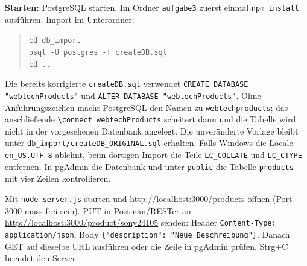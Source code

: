 \documentclass[11pt,a4paper]{article}
\begin{document}
\textbf{Starten:} PostgreSQL starten. Im Ordner \texttt{aufgabe3} zuerst einmal
\texttt{npm install} ausführen. Import im Unterordner:
\begin{quote}
\texttt{cd db\_import}\\
\texttt{psql -U postgres -f createDB.sql}\\
\texttt{cd ..}
\end{quote}
Die bereits korrigierte \texttt{createDB.sql} verwendet
\texttt{CREATE DATABASE "webtechProducts"} und
\texttt{ALTER DATABASE "webtechProducts"}. Ohne Anführungszeichen macht
PostgreSQL den Namen zu \texttt{webtechproducts}; das anschließende
\texttt{\textbackslash connect webtechProducts} scheitert dann und die
Tabelle wird nicht in der vorgesehenen Datenbank angelegt.
Die unveränderte Vorlage bleibt unter
\texttt{db\_import/createDB\_ORIGINAL.sql} erhalten.
Falls Windows die Locale \texttt{en\_US.UTF-8} ablehnt, beim dortigen
Import die Teile \texttt{LC\_COLLATE} und \texttt{LC\_CTYPE} entfernen.
In pgAdmin die Datenbank und unter \texttt{public} die Tabelle
\texttt{products} mit vier Zeilen kontrollieren.

Mit \texttt{node server.js} starten und
\url{http://localhost:3000/products} öffnen (Port 3000 muss frei sein).
PUT in Postman/RESTer an
\url{http://localhost:3000/product/sony24105} senden:
Header \texttt{Content-Type: application/json}, Body
\texttt{\{"description": "Neue Beschreibung"\}}.
Danach GET auf dieselbe URL ausführen oder die Zeile in pgAdmin prüfen.
Strg+C beendet den Server.
\end{document}
